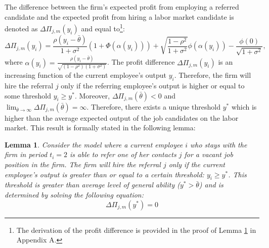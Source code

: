 \documentclass[12pt]{article}
\newtheorem{lemma}{Lemma}
\begin{document}
The difference between the firm's expected profit from employing a referred candidate and the expected profit from hiring a labor market candidate is denoted as $\Delta\Pi_{j,m}(y_i)$ and equal to\footnote{The derivation of the profit difference is provided in the proof of Lemma \ref{lemma:y_star_existence} in Appendix A.}: 
\begin{equation}\label{eq:profit_dif}
    \Delta\Pi_{j,m}(y_i) =  \frac{\rho\left(y_i-\bar{\theta}\right)}{1 + \sigma^2}\left(1+\Phi\left(\alpha(y_i)\right)\right)
    + \sqrt{\frac{1-\rho^2}{1+\sigma^2}}\phi\left(\alpha(y_i)\right) - \frac{\phi(0)}{\sqrt{1+\sigma^2}},
\end{equation}
where $\alpha(y_i) = \frac{\rho\left(y_i - \bar{\theta}\right)}{\sqrt{(1-\rho^2)(1+\sigma^2)}}$. The profit difference $\Delta\Pi_{j,m}(y_i)$ is an increasing function of the current employee's output $y_i$. Therefore, the firm will hire the referral $j$ only if the referring employee's output is higher or equal to some threshold $y_i \geq y^*$. Moreover, $\Delta\Pi_{j,m}(\bar{\theta}) < 0$ and $\lim_{\bar{\theta} \rightarrow \infty} \Delta\Pi_{j,m}(\bar{\theta}) = \infty$. Therefore, there exists a unique threshold $y^*$ which is higher than the average expected output of the job candidates on the labor market. This result is formally stated in the following lemma:
\begin{lemma}\label{lemma:y_star_existence}
    Consider the model where a current employee $i$ who stays with the firm in period $t_i = 2$ is able to refer one of her contacts $j$ for a vacant job position in the firm. The firm will hire the referral $j$ only if the current employee's output is greater than or equal to a certain threshold: $y_i \geq y^*$. This threshold is greater than average level of general ability ($y^* > \bar{\theta}$) and is determined by solving the following equation:
    \begin{equation}
        \Delta\Pi_{j,m}(y^*) = 0
    \end{equation}
\end{lemma}

\end{document}
